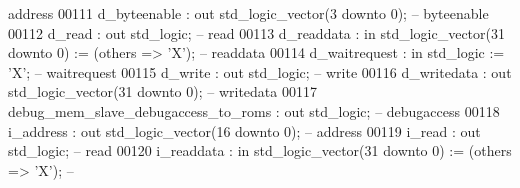 \begin{DoxyCode}
{       address}
00111             d\_byteenable                        : \textcolor{keywordflow}{out} \textcolor{comment}{std\_logic\_vector}(\textcolor{vhdllogic}{}\textcolor{vhdllogic}{3} \textcolor{keywordflow}{downto} \textcolor{vhdllogic}{}\textcolor{vhdllogic}{0});                     \textcolor{keyword}{--
       byteenable}
00112             d\_read                              : \textcolor{keywordflow}{out} \textcolor{comment}{std\_logic};                                        \textcolor{keyword}{--
       read}
00113             d\_readdata                          : \textcolor{keywordflow}{in}  \textcolor{comment}{std\_logic\_vector}(\textcolor{vhdllogic}{}\textcolor{vhdllogic}{31} \textcolor{keywordflow}{downto} \textcolor{vhdllogic}{}\textcolor{vhdllogic}{0}) := (\textcolor{keywordflow}{others} => 'X'); \textcolor{keyword}{--
       readdata}
00114             d\_waitrequest                       : \textcolor{keywordflow}{in}  \textcolor{comment}{std\_logic}                     := 'X';             \textcolor{keyword}{--
       waitrequest}
00115             d\_write                             : \textcolor{keywordflow}{out} \textcolor{comment}{std\_logic};                                        \textcolor{keyword}{--
       write}
00116             d\_writedata                         : \textcolor{keywordflow}{out} \textcolor{comment}{std\_logic\_vector}(\textcolor{vhdllogic}{}\textcolor{vhdllogic}{31} \textcolor{keywordflow}{downto} \textcolor{vhdllogic}{}\textcolor{vhdllogic}{0});                    \textcolor{keyword}{--
       writedata}
00117             debug\_mem\_slave\_debugaccess\_to\_roms : \textcolor{keywordflow}{out} \textcolor{comment}{std\_logic};                                        \textcolor{keyword}{--
       debugaccess}
00118             i\_address                           : \textcolor{keywordflow}{out} \textcolor{comment}{std\_logic\_vector}(\textcolor{vhdllogic}{}\textcolor{vhdllogic}{16} \textcolor{keywordflow}{downto} \textcolor{vhdllogic}{}\textcolor{vhdllogic}{0});                    \textcolor{keyword}{--
       address}
00119             i\_read                              : \textcolor{keywordflow}{out} \textcolor{comment}{std\_logic};                                        \textcolor{keyword}{--
       read}
00120             i\_readdata                          : \textcolor{keywordflow}{in}  \textcolor{comment}{std\_logic\_vector}(\textcolor{vhdllogic}{}\textcolor{vhdllogic}{31} \textcolor{keywordflow}{downto} \textcolor{vhdllogic}{}\textcolor{vhdllogic}{0}) := (\textcolor{keywordflow}{others} => 'X'); \textcolor{keyword}{--
}
\end{DoxyCode}
